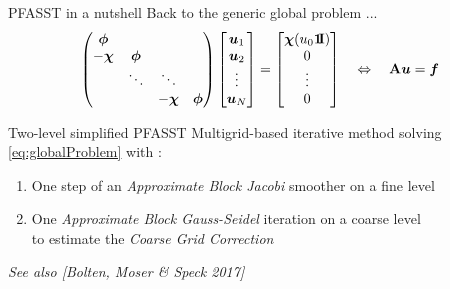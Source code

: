 \documentclass[11pt,aspectratio=43]{beamer}
\newcommand{\ones}{\mbox{1\hspace{-0.2em}I}}
\newcommand{\matr}[1]{\mathbf{#1}}
\newcommand{\vect}[1]{\boldsymbol{#1}}
\newcommand{\uvect}{\vect{u}}
\begin{document}
\begin{frame}{PFASST in a nutshell}
   	Back to the generic global problem ...
    \begin{equation}\label{eq:globalProblem}
    	\begin{pmatrix}
        \bm{\phi} & & &\\
        -\bm{\chi} & \bm{\phi} & &\\
        & \ddots & \ddots &\\
        & & -\bm{\chi} & \bm{\phi}
    \end{pmatrix}
    \begin{bmatrix}
        \uvect_1\\\uvect_2\\\vdots\\\uvect_N
    \end{bmatrix}
    =
    \begin{bmatrix}
        \bm{\chi}(u_0\vect{\ones})\\0\\\vdots\\0
    \end{bmatrix}
    \quad \Leftrightarrow \quad
    \matr{A}\uvect = \vect{f}
    \end{equation}
    
    \begin{block}{Two-level simplified PFASST}
    Multigrid-based iterative method solving \eqref{eq:globalProblem} with :
    \begin{enumerate}
    	\item One step of an \textit{Approximate Block Jacobi} smoother on a fine level
    	\item One \textit{Approximate Block Gauss-Seidel} iteration on a coarse level \\
    	to estimate the \textit{Coarse Grid Correction}
    \end{enumerate}
    \end{block}
	\textit{See also [Bolten, Moser \& Speck 2017]}\vspace{-20pt}
\end{frame}
\end{document}
